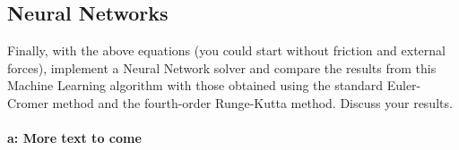 \subsection{Neural Networks}

Finally, with the above equations (you could start without friction and external forces), implement a Neural Network solver and compare the results from this Machine Learning algorithm with those obtained using the standard Euler-Cromer method and the fourth-order Runge-Kutta method. Discuss your results.






\paragraph{a: More text to come}








